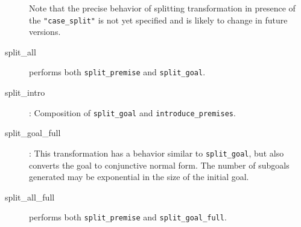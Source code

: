 \begin{description}
Note that the precise behavior of splitting transformation in presence of
the \verb|"case_split"| is not yet specified
and is likely to change in future versions.


\item[split\_all]
  performs both \texttt{split\_premise} and \texttt{split\_goal}.

\item[split\_intro]: Composition of \texttt{split\_goal} and \texttt{introduce\_premises}.

\item[split\_goal\_full]: This transformation has a behavior similar
  to \texttt{split\_goal}, but also converts the goal to conjunctive normal form.
  The number of subgoals generated may be exponential in the size of the initial goal.

\item[split\_all\_full]
  performs both \texttt{split\_premise} and \texttt{split\_goal\_full}.


\end{description}


